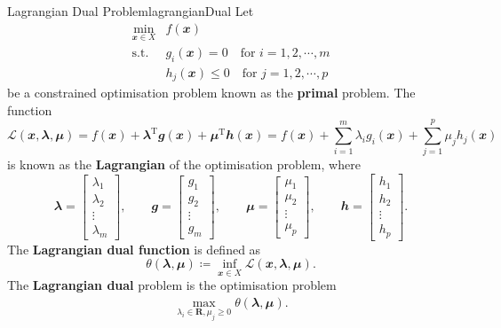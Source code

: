 \documentclass[math, code]{amznotes}
\theoremstyle{remark}
\begin{document}
\begin{dfnbox}{Lagrangian Dual Problem}{lagrangianDual}
    Let
    \begin{align*}
        \min_{\mathbfit{x} \in X} & f(\mathbfit{x}) \\
        \textrm{s.t. } & g_i(\mathbfit{x}) = 0 \quad\textrm{for } i = 1, 2, \cdots, m \\
        & h_j(\mathbfit{x}) \leq 0 \quad\textrm{for } j = 1, 2, \cdots, p
    \end{align*}
    be a constrained optimisation problem known as the {\color{red} \textbf{primal}} problem. The function
    \begin{equation*}
        \mathcal{L}(\mathbfit{x}, \mathbfit{\lambda}, \mathbfit{\mu}) = f(\mathbfit{x}) + \mathbfit{\lambda}^{\mathrm{T}}\mathbfit{g}(\mathbfit{x}) + \mathbfit{\mu}^{\mathrm{T}}\mathbfit{h}(\mathbfit{x}) = f(\mathbfit{x}) + \sum_{i = 1}^{m}\lambda_i g_i(\mathbfit{x}) + \sum_{j = 1}^{p}\mu_j h_j(\mathbfit{x})
    \end{equation*}
    is known as the {\color{red} \textbf{Lagrangian}} of the optimisation problem, where
    \begin{equation*}
        \mathbfit{\lambda} = \begin{bmatrix}
            \lambda_1 \\
            \lambda_2 \\
            \vdots \\
            \lambda_m
        \end{bmatrix}, \qquad \mathbfit{g} = \begin{bmatrix}
            g_1 \\
            g_2 \\
            \vdots \\
            g_m
        \end{bmatrix}, \qquad \mathbfit{\mu} = \begin{bmatrix}
            \mu_1 \\
            \mu_2 \\
            \vdots \\
            \mu_p
        \end{bmatrix}, \qquad \mathbfit{h} = \begin{bmatrix}
            h_1 \\
            h_2 \\
            \vdots \\
            h_p
        \end{bmatrix}.
    \end{equation*}
    The {\color{red} \textbf{Lagrangian dual function}} is defined as
    \begin{equation*}
        \theta(\mathbfit{\lambda}, \mathbfit{\mu}) \coloneqq \inf_{\mathbfit{x} \in X}\mathcal{L}(\mathbfit{x}, \mathbfit{\lambda}, \mathbfit{\mu}).
    \end{equation*}
    The {\color{red} \textbf{Lagrangian dual}} problem is the optimisation problem
    \begin{align*}
        \max_{\lambda_i \in \mathbf{R}, \mu_j \geq 0}\theta(\mathbfit{\lambda}, \mathbfit{\mu}).
    \end{align*}
\end{dfnbox}
\end{document}
